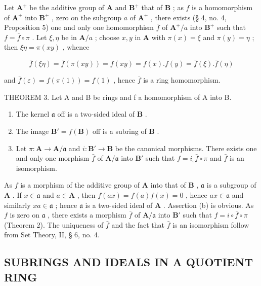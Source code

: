 Let \(\mathbf{A}^{+}\) be the additive group of \(\mathbf{A}\) and \(\mathbf{B}^{+}\) that of \(\mathbf{B}\) ; as \(f\) is a homomorphism of \(\mathbf{A}^{+}\) into \(\mathbf{B}^{+}\) , zero on the subgroup \(a\) of \(\mathbf{A}^{+}\) , there exists (§ 4, no. 4, Proposition 5) one and only one homomorphism \(\bar{f}\) of \(\mathbf{A}^{+}/a\) into \(\mathbf{B}^{+}\) such that \(f = \bar{f} \circ \pi\) . Let \(\xi, \eta\) be in \(\mathbf{A}/a\) ; choose \(x, y\) in \(\mathbf{A}\) with \(\pi(x) = \xi\) and \(\pi(y) = \eta\) ; then \(\xi \eta = \pi(xy)\) , whence

\[
\bar {f} (\xi \eta) = \bar {f} (\pi (x y)) = f (x y) = f (x). f (y) = \bar {f} (\xi). \bar {f} (\eta)
\]

and \(\bar{f}(\varepsilon) = f(\pi(1)) = f(1)\) , hence \(\bar{f}\) is a ring homomorphism.

THEOREM 3. Let A and B be rings and f a homomorphism of A into B.

\begin{enumerate}
\def\labelenumi{(\alph{enumi})}
\item
  The kernel \(\mathfrak{a}\) off is a two-sided ideal of \(\mathbf{B}\) .
\item
  The image \(\mathbf{B}' = f(\mathbf{B})\) off is a subring of \(\mathbf{B}\) .
\item
  Let \(\pi: \mathbf{A} \to \mathbf{A} / \mathfrak{a}\) and \(i: \mathbf{B}' \to \mathbf{B}\) be the canonical morphisms. There exists one and only one morphism \(\bar{f}\) of \(\mathbf{A} / \mathfrak{a}\) into \(\mathbf{B}'\) such that \(f = i_{\circ} \bar{f} \circ \pi\) and \(\bar{f}\) is an isomorphism.
\end{enumerate}

As \(f\) is a morphism of the additive group of \(\mathbf{A}\) into that of \(\mathbf{B}\) , \(\mathfrak{a}\) is a subgroup of \(\mathbf{A}\) . If \(x \in \mathfrak{a}\) and \(a \in \mathbf{A}\) , then \(f(ax) = f(a)f(x) = 0\) , hence \(ax \in \mathfrak{a}\) and similarly \(xa \in \mathfrak{a}\) ; hence \(\mathfrak{a}\) is a two-sided ideal of \(\mathbf{A}\) . Assertion (b) is obvious. As \(f\) is zero on \(\mathfrak{a}\) , there exists a morphism \(\bar{f}\) of \(\mathbf{A} / \mathfrak{a}\) into \(\mathbf{B}'\) such that \(f = i \circ \bar{f} \circ \pi\) (Theorem 2). The uniqueness of \(\bar{f}\) and the fact that \(\bar{f}\) is an isomorphism follow from Set Theory, II, § 6, no. 4.

\subsection{SUBRINGS AND IDEALS IN A QUOTIENT RING}

